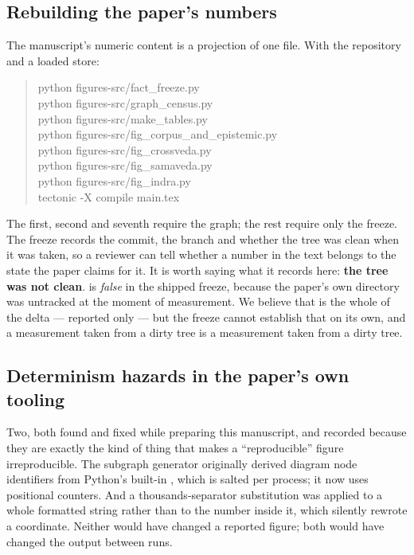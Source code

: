 \subsection{Rebuilding the paper's numbers}

The manuscript's numeric content is a projection of one file. With the repository and
a loaded store:

\begin{quote}\small\ttfamily
python figures-src/fact\_freeze.py\\
python figures-src/graph\_census.py\\
python figures-src/make\_tables.py\\
python figures-src/fig\_corpus\_and\_epistemic.py\\
python figures-src/fig\_crossveda.py\\
python figures-src/fig\_samaveda.py\\
python figures-src/fig\_indra.py\\
tectonic -X compile main.tex
\end{quote}

The first, second and seventh require the graph; the rest require only the freeze.
The freeze records the commit, the branch and whether the tree was clean when it was
taken, so a reviewer can tell whether a number in the text belongs to the state the
paper claims for it. It is worth saying what it records here: \textbf{the tree was
not clean}.  is \emph{false} in the shipped freeze, because
the paper's own directory was untracked at the moment of measurement. We believe
that is the whole of the delta ---  reported only
 --- but the freeze cannot establish that on its own, and a
measurement taken from a dirty tree is a measurement taken from a dirty tree.

\subsection{Determinism hazards in the paper's own tooling}

Two, both found and fixed while preparing this manuscript, and recorded because they
are exactly the kind of thing that makes a ``reproducible'' figure irreproducible.
The subgraph generator originally derived diagram node identifiers from Python's
built-in , which is salted per process; it now uses positional counters.
And a thousands-separator substitution was applied to a whole formatted string rather
than to the number inside it, which silently rewrote a coordinate. Neither would have
changed a reported figure; both would have changed the output between runs.
